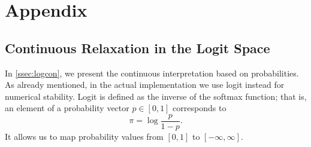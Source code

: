 \documentclass[sigplan,10pt,anonymous]{acmart} %
\theoremstyle{plain}
\theoremstyle{remark}
\theoremstyle{definition}
\begin{document}
%
\clearpage
{}



\appendix\clearpage

\section{Appendix}

\subsection{Continuous Relaxation in the Logit Space}\label{app:appendix-logit}

In \cref{ssec:logcon}, we present the continuous interpretation based on probabilities.
As already mentioned, in the actual implementation we use logit instead for numerical stability.
Logit is defined as the inverse of the softmax function; that is, an element of a probability vector $p \in [0,1]$ corresponds to
\begin{equation*}
  \pi = \log \frac{p}{1 - p}.
\end{equation*}
It allows us to map probability values from $\left[ 0, 1 \right]$ to $\left[ -\infty, \infty \right]$.
\end{document}
